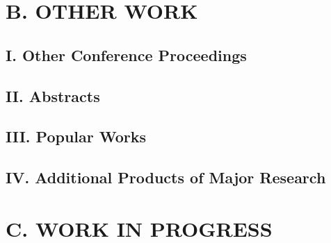 \documentclass{res}
\newcommand{\MarginText}[1]{\section{#1}\vspace{10pt}}
\begin{document}
\begin{resume}
  \MarginText{B. OTHER WORK}
  \subsection{I. Other Conference Proceedings}
  \nocite{*}
  \vspace{10pt}
  \printbibliography[heading=none]

  \subsection{II. Abstracts}
  \subsection{III. Popular Works}
  \subsection{IV. Additional Products of Major Research}
  \nocite{*}
  \vspace{10pt}
  \printbibliography[heading=none]

  \MarginText{C. WORK IN PROGRESS}
  \nocite{*}
  \vspace{10pt}
  \printbibliography[heading=none]
  \clearpage

\end{resume}
\end{document}
